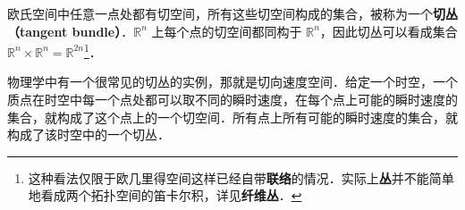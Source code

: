 欧氏空间中任意一点处都有切空间，所有这些切空间构成的集合，被称为一个\textbf{切丛（tangent bundle）}．$\mathbb{R}^n$ 上每个点的切空间都同构于 $\mathbb{R}^n$，因此切丛可以看成集合 $\mathbb{R}^n\times\mathbb{R}^n=\mathbb{R}^{2n}$\footnote{这种看法仅限于欧几里得空间这样已经自带\textbf{联络}的情况．实际上\textbf{丛}并不能简单地看成两个拓扑空间的笛卡尔积，详见\textbf{纤维丛}．}．

物理学中有一个很常见的切丛的实例，那就是切向速度空间．给定一个时空，一个质点在时空中每一个点处都可以取不同的瞬时速度，在每个点上可能的瞬时速度的集合，就构成了这个点上的一个切空间．所有点上所有可能的瞬时速度的集合，就构成了该时空中的一个切丛．









